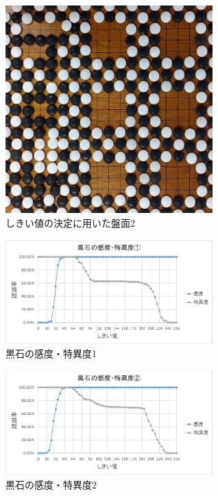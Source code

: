 \documentclass[openright]{nitocs}
\numberwithin{equation}{section}
\begin{document}
            \begin{figure}[tb] %
                \begin{center}
                \includegraphics[clip,width=80mm]{DSC_0100/boardImg.jpg} 
                \caption{しきい値の決定に用いた盤面2}
                \label{DSC0100}
                \end{center}
            \end{figure}

            \begin{figure}[tb] %
                \begin{center}
                \includegraphics[clip,width=80mm]{Case1_Black_TPF_TNF.eps} 
                \caption{黒石の感度・特異度1}
                \label{Case1Black}
                \end{center}
            \end{figure}

            \begin{figure}[tb] %
                \begin{center}
                \includegraphics[clip,width=80mm]{Case2_Black_TPF_TNF.eps} 
                \caption{黒石の感度・特異度2}
                \label{Case2Black}
                \end{center}
            \end{figure}
\end{document}
